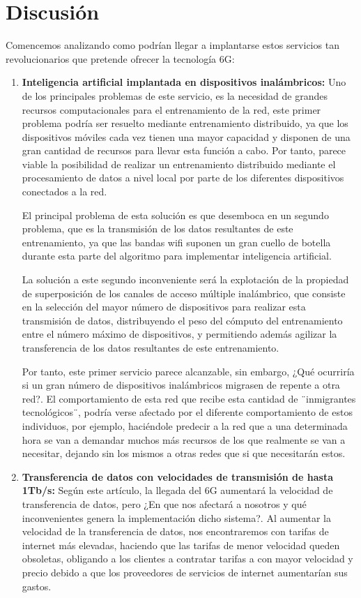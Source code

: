 \section{Discusión}
\label{sec:discusion}
Comencemos analizando como podrían llegar a implantarse estos servicios tan revolucionarios que pretende ofrecer la tecnología 6G:
\begin{enumerate}
\item {\bfseries Inteligencia artificial implantada en dispositivos inalámbricos:  }
Uno de los principales problemas de este servicio, es la necesidad de grandes recursos computacionales para el entrenamiento de la red, este primer problema podría ser resuelto mediante entrenamiento distribuido, ya que los dispositivos móviles cada vez tienen una mayor capacidad y disponen de una gran cantidad de recursos para llevar esta función a cabo. Por tanto, parece viable la posibilidad de realizar un entrenamiento distribuido mediante el procesamiento de datos a nivel local por parte de los diferentes dispositivos conectados a la red.

El principal problema de esta solución es que desemboca en un segundo problema, que es la transmisión de los datos resultantes de este entrenamiento, ya que las bandas wifi suponen un gran cuello de botella durante esta parte del algoritmo para implementar inteligencia artificial. 

La solución a este segundo inconveniente será la explotación de la propiedad de superposición de los canales de acceso múltiple inalámbrico, que consiste en la selección del mayor número de dispositivos para realizar esta transmisión de datos, distribuyendo el peso del cómputo del entrenamiento entre el número máximo de dispositivos, y permitiendo además agilizar la transferencia de los datos resultantes de este entrenamiento.

Por tanto, este primer servicio parece alcanzable, sin embargo, ¿Qué ocurriría si un gran número de dispositivos inalámbricos migrasen de repente a otra red?. El comportamiento de esta red que recibe esta cantidad de ¨inmigrantes tecnológicos¨, podría verse afectado por el diferente comportamiento de estos individuos, por ejemplo, haciéndole predecir a la red que a una determinada hora se van a demandar muchos más recursos de los que realmente se van a necesitar, dejando sin los mismos a otras redes que si que necesitarán estos.

\item {\bfseries Transferencia de datos con velocidades de transmisión de hasta 1Tb/s:  }
Según este artículo, la llegada del 6G aumentará la velocidad de transferencia de datos, pero ¿En que nos afectará a nosotros y qué inconvenientes genera la implementación dicho sistema?. Al aumentar la velocidad de la transferencia de datos, nos encontraremos con tarifas de internet más elevadas, haciendo que las tarifas de menor velocidad queden obsoletas, obligando a los clientes a contratar tarifas a con mayor velocidad y precio debido a que los proveedores de servicios de internet aumentarían sus gastos.


\end{enumerate}

